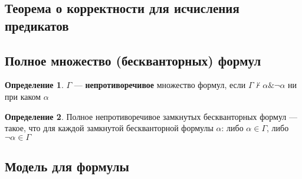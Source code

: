 \documentclass[english]{article}
\theoremstyle{plain}
\theoremstyle{remark}
\theoremstyle{definition}
\newtheorem*{definition}{Определение}
\begin{document}
\subsection{Теорема о корректности для исчисления предикатов}
\label{sec:orgafecafb}
\subsection{Полное множество (бескванторных) формул}
\label{sec:orgbb9449f}
\begin{definition}
\(\Gamma\) --- \textbf{непротиворечивое} множество формул, если \(\Gamma \not\vdash \alpha \& \neg \alpha\) ни при каком \(\alpha\)
\label{org64c76ea}
\end{definition}
\begin{definition}
Полное непротиворечивое замкнутых бескванторных формул --- такое, что для каждой замкнутой бескванторной формулы \(\alpha\): либо \(\alpha \in \Gamma\), либо \(\neg \alpha \in \Gamma\)
\label{org2c04498}
\end{definition}
\subsection{Модель для формулы}
\label{sec:org11853e2}
\end{document}
